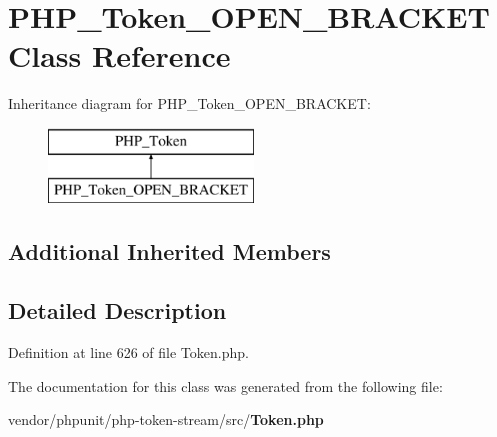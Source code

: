 \section{P\+H\+P\+\_\+\+Token\+\_\+\+O\+P\+E\+N\+\_\+\+B\+R\+A\+C\+K\+E\+T Class Reference}
\label{class_p_h_p___token___o_p_e_n___b_r_a_c_k_e_t}
Inheritance diagram for P\+H\+P\+\_\+\+Token\+\_\+\+O\+P\+E\+N\+\_\+\+B\+R\+A\+C\+K\+E\+T\+:\begin{figure}[H]
\begin{center}
\leavevmode
\includegraphics[height=2.000000cm]{class_p_h_p___token___o_p_e_n___b_r_a_c_k_e_t}
\end{center}
\end{figure}
\subsection*{Additional Inherited Members}


\subsection{Detailed Description}


Definition at line 626 of file Token.\+php.



The documentation for this class was generated from the following file\+:\begin{DoxyCompactItemize}
\item 
vendor/phpunit/php-\/token-\/stream/src/{\bf Token.\+php}\end{DoxyCompactItemize}
